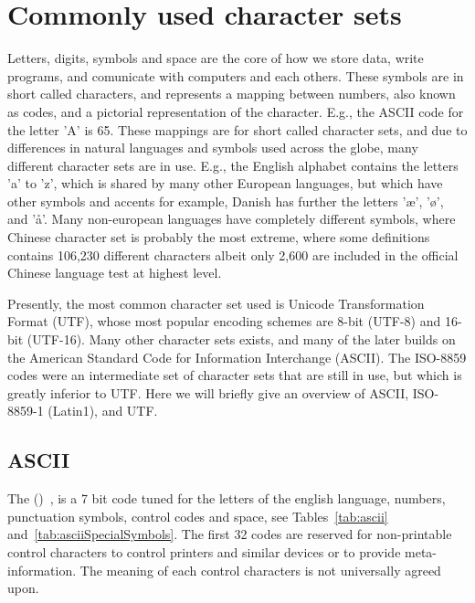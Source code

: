 \chapter{Commonly used character sets}
\label{sec:characterSets}
Letters, digits, symbols and space are the core of how we store data, write programs, and comunicate with computers and each others. These symbols are in short called characters, and represents a mapping between numbers, also known as codes, and a pictorial representation of the character. E.g., the ASCII code for the letter 'A' is 65. These mappings are for short called character sets, and due to differences in natural languages and symbols used across the globe, many different character sets are in use. E.g., the English alphabet contains the letters 'a' to 'z', which is shared by many other European languages, but which have other symbols and accents for example, Danish has further the letters 'æ', 'ø', and 'å'. Many non-european languages have completely different symbols, where Chinese character set is probably the most extreme, where some definitions contains 106,230 different characters albeit only 2,600 are included in the official Chinese language test at highest level.

Presently, the most common character set used is Unicode Transformation Format (UTF), whose most popular encoding schemes are 8-bit (UTF-8) and 16-bit (UTF-16). Many other character sets exists, and many of the later builds on the American Standard Code for Information Interchange (ASCII). The ISO-8859 codes were an intermediate set of character sets that are still in use, but which is greatly inferior to UTF. Here we will briefly give an overview of ASCII, ISO-8859-1 (Latin1), and UTF.

\section{ASCII}
\label{sec:ascii}
The  ()~\cite{ascii63}, is a 7 bit code tuned for the letters of the english language, numbers, punctuation symbols, control codes and space, see Tables~\ref{tab:ascii} and~\ref{tab:asciiSpecialSymbols}. The first 32 codes are reserved for non-printable control characters to control printers and similar devices or to provide meta-information. The meaning of each control characters is not universally agreed upon.

